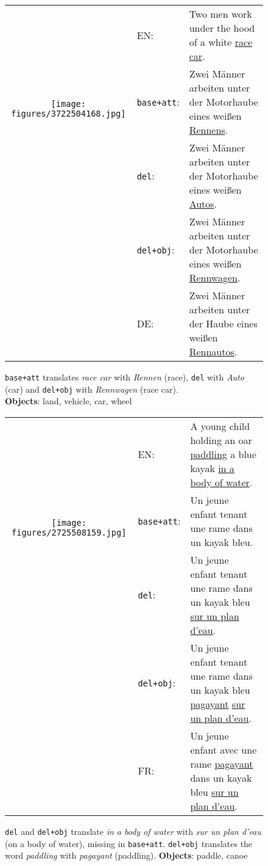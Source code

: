 \documentclass[11pt,a4paper]{article}
\newcommand{\baseatt}{\texttt{base+att}\xspace}
\newcommand{\delib}{\texttt{del}\xspace}
\newcommand{\delibattobj}{\texttt{del+obj}\xspace}
\begin{document}
\begin{figure*}[!h]
  \begin{subfigure}[c]{\textwidth}
  \vspace{1em}
  \begin{small}
    \begin{tabular}{c p{1.5cm}p{10cm}}
      \multirow{3}[15]{*}{\texttt{[image: figures/3722504168.jpg]}} & EN: & Two men work under the hood of a white \underline{race car}. \\[1ex]
      & \baseatt: & Zwei M{\"a}nner arbeiten unter der Motorhaube eines wei{\ss}en \underline{Rennens}.\\[1ex]
      & \delib: & Zwei M{\"a}nner arbeiten unter der Motorhaube eines wei{\ss}en \underline{Autos}.\\[1ex]
      & \delibattobj: & Zwei M{\"a}nner arbeiten unter der Motorhaube eines wei{\ss}en \underline{Rennwagen}.\\[1ex]
      & DE: & Zwei M{\"a}nner arbeiten unter der Haube eines wei{\ss}en \underline{Rennautos}. \\[1ex]
  \end{tabular}
  \end{small}
  \caption{ \baseatt translates \textit{race car} with \textit{Rennen} (race), \delib with \textit{Auto} (car) and \delibattobj with \textit{Rennwagen} (race car). \\ \textbf{Objects}: land, vehicle, car, wheel}
  \end{subfigure}
  \begin{subfigure}[c]{\textwidth}
  \vspace{1em}
    \begin{small}
    \begin{tabular}{c p{1.7cm}p{9.6cm}}
      \multirow{3}[15]{*}{\texttt{[image: figures/2725508159.jpg]}} & EN: & A young child holding an oar \underline{paddling} a blue kayak \underline{in a body of water}. \\[1ex]
      & \baseatt: & Un jeune enfant tenant une rame dans un kayak bleu. \\[1ex]
      & \delib: &  Un jeune enfant tenant une rame dans un kayak bleu \underline{sur un plan d'eau}. \\[1ex]
      & \delibattobj: & Un jeune enfant tenant une rame dans un kayak bleu \underline{pagayant} \underline{sur un plan d'eau}. \\[1ex]
      & FR: & Un jeune enfant avec une rame \underline{pagayant} dans un kayak bleu \underline{sur un plan d'eau}. \\[1ex]
  \end{tabular}
  \end{small}
  \caption{\delib and \delibattobj translate \textit{in a body of water} with \textit{sur un plan d'eau} (on a body of water), missing in \baseatt. \delibattobj translates the word \textit{paddling} with \textit{pagayant} (paddling). \textbf{Objects}: paddle, canoe}
  \end{subfigure}
\caption{\label{fig:main_ex} Examples of improvements of \delib and \delibattobj over \baseatt for test set 2016 for French and German. Underlined words represent some of the improvements.}
\end{figure*}
\end{document}
